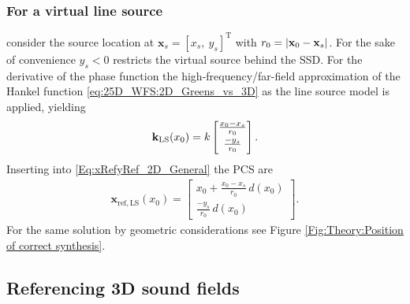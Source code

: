 \subsubsection{For a virtual line source} consider the source location at $\mathbf{x}_s = [ x_s,\ y_s ]^{\mathrm{T}}$ with $r_0 = | \mathbf{x}_0 - \mathbf{x}_s |$. 
For the sake of convenience $y_s<0$ restricts the virtual source behind the SSD. 
For the derivative of the phase function the high-frequency/far-field approximation of the Hankel function \eqref{eq:25D_WFS:2D_Greens_vs_3D}  as the line source model is applied, yielding
%
\begin{equation} 
\label{Eq:kx0_LS}
\mathbf{k}_\text{LS}(x_0)
=k\begin{bmatrix} 
\frac{x_0- x_s}{r_0}
\\[0.3em] 
\frac{-y_s}{r_0}
\\[0.3em]    \end{bmatrix}.
\end{equation}
%
Inserting into \eqref{Eq:xRefyRef_2D_General} the PCS are
%
\begin{align}
\mathbf{x}_{\mathrm{ref,LS}}(x_0)=
\begin{bmatrix}
x_0 + \frac{x_0-x_s}{r_0} \, d(x_0) \\
\frac{-y_s}{r_0} \, d(x_0)
\end{bmatrix}.
\label{Eq:Line_source_correcty_synth}
\end{align}
For the same solution by geometric considerations see Figure \ref{Fig:Theory:Position of correct synthesis}.



\subsection{Referencing 3D sound fields}

